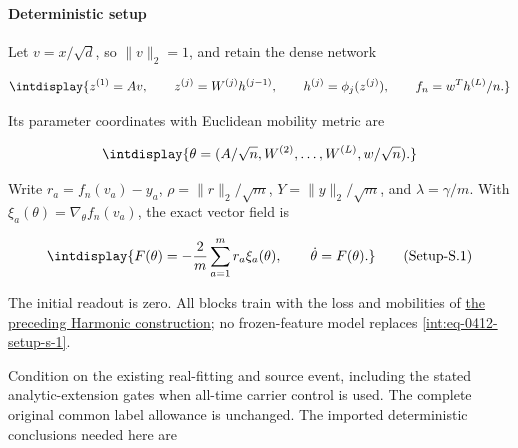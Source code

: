 \paragraph{Deterministic setup}
\label{int:setup-stability-1}
\mbox{}\par\smallskip


Let \(v=x/\sqrt d\), so \(\|v\|_2=1\), and retain the dense network


\begingroup\renewcommand{\theHequation}{intdisplay.840}
\begin{equation*}
\intdisplay{
z^{(1)}=Av,\qquad z^{(j)}=W^{(j)}h^{(j-1)},\qquad
h^{(j)}=\phi_j(z^{(j)}),\qquad f_n=w^Th^{(L)}/n.
}
\end{equation*}
\endgroup


Its parameter coordinates with Euclidean mobility metric are


\begingroup\renewcommand{\theHequation}{intdisplay.841}
\begin{equation*}
\intdisplay{
\theta=(A/\sqrt n,W^{(2)},\ldots,W^{(L)},w/\sqrt n).
}
\end{equation*}
\endgroup


Write \(r_a=f_n(v_a)-y_a\), \(\rho=\|r\|_2/\sqrt m\), \(Y=\|y\|_2/\sqrt m\), and \(\lambda=\gamma/m\). With \(\xi_a(\theta)=\nabla_\theta f_n(v_a)\), the exact vector field is


\label{int:eq-setup-s-1}
\begingroup\renewcommand{\theHequation}{intdisplay.842}
\begin{equation}
\intdisplay{
F(\theta)=-\frac2m\sum_{a=1}^m r_a\xi_a(\theta),\qquad
\dot\theta=F(\theta).
}
\tag{Setup-S.1}
\label{int:eq-0412-setup-s-1}
\end{equation}
\endgroup


The initial readout is zero. All blocks train with the loss and mobilities of \hyperref[int:harmonic-construction]{the preceding Harmonic construction}; no frozen-feature model replaces \hyperref[int:eq-setup-s-1]{\eqref{int:eq-0412-setup-s-1}}.



Condition on the existing real-fitting and source event, including the stated analytic-extension gates when all-time carrier control is used. The complete original common label allowance is unchanged. The imported deterministic conclusions needed here are


